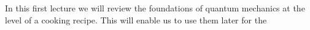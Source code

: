 In this first lecture we will review the foundations of quantum mechanics at the level of a cooking recipe. This will enable us to use them later for the 